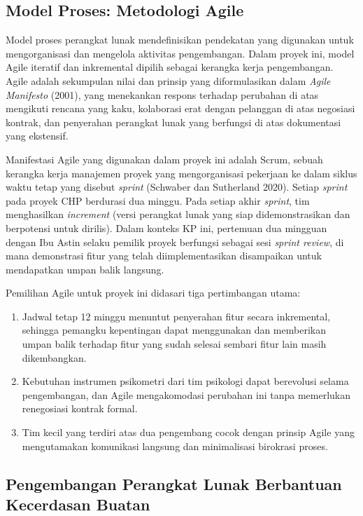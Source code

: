 \subsection{Model Proses: Metodologi Agile}
\label{subsec:agile}

Model proses perangkat lunak mendefinisikan pendekatan yang digunakan untuk mengorganisasi dan mengelola aktivitas pengembangan. Dalam proyek ini, model Agile iteratif dan inkremental dipilih sebagai kerangka kerja pengembangan. Agile adalah sekumpulan nilai dan prinsip yang diformulasikan dalam \textit{Agile Manifesto} (2001), yang menekankan respons terhadap perubahan di atas mengikuti rencana yang kaku, kolaborasi erat dengan pelanggan di atas negosiasi kontrak, dan penyerahan perangkat lunak yang berfungsi di atas dokumentasi yang ekstensif.

Manifestasi Agile yang digunakan dalam proyek ini adalah Scrum, sebuah kerangka kerja manajemen proyek yang mengorganisasi pekerjaan ke dalam siklus waktu tetap yang disebut \textit{sprint} (Schwaber dan Sutherland 2020). Setiap \textit{sprint} pada proyek CHP berdurasi dua minggu. Pada setiap akhir \textit{sprint}, tim menghasilkan \textit{increment} (versi perangkat lunak yang siap didemonstrasikan dan berpotensi untuk dirilis). Dalam konteks KP ini, pertemuan dua mingguan dengan Ibu Astin selaku pemilik proyek berfungsi sebagai sesi \textit{sprint review}, di mana demonstrasi fitur yang telah diimplementasikan disampaikan untuk mendapatkan umpan balik langsung.

Pemilihan Agile untuk proyek ini didasari tiga pertimbangan utama:

\begin{enumerate}[leftmargin=2cm]
  \item Jadwal tetap 12 minggu menuntut penyerahan fitur secara inkremental, sehingga pemangku kepentingan dapat menggunakan dan memberikan umpan balik terhadap fitur yang sudah selesai sembari fitur lain masih dikembangkan.
  \item Kebutuhan instrumen psikometri dari tim psikologi dapat berevolusi selama pengembangan, dan Agile mengakomodasi perubahan ini tanpa memerlukan renegosiasi kontrak formal.
  \item Tim kecil yang terdiri atas dua pengembang cocok dengan prinsip Agile yang mengutamakan komunikasi langsung dan minimalisasi birokrasi proses.
\end{enumerate}

\subsection{Pengembangan Perangkat Lunak Berbantuan Kecerdasan Buatan}
\label{subsec:ai-assisted}

